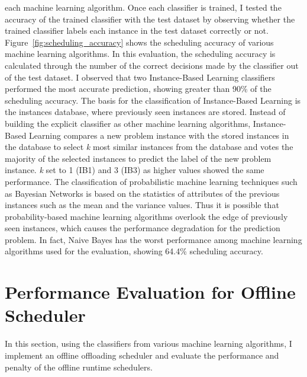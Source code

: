 each machine learning algorithm.
%
Once each classifier is trained, I tested the accuracy of the
trained classifier with the test dataset by observing whether the
trained classifier labels each instance in the test dataset correctly or
not.\\
%
Figure~\ref{fig:scheduling_accuracy} shows the scheduling accuracy of
various machine learning algorithms.
%
In this evaluation, the scheduling accuracy is calculated through the
number of the correct decisions made by the classifier out of the test
dataset.
%
I observed that two Instance-Based Learning classifiers performed 
the most accurate prediction, showing greater than 90\% of the scheduling
accuracy.
%
The basis for the classification of Instance-Based Learning is the instances 
database, where previously seen instances are stored.
%
Instead of building the explicit classifier as other machine learning
algorithms, Instance-Based Learning compares a new problem instance with the stored
instances in the database to select {\it k} most similar instances 
from the database and votes the majority of the selected instances to 
predict the label of the new problem instance.
%
{\it k} set to 1 (IB1) and 3 (IB3) as higher values showed the same
performance. 
%
The classification of probabilistic machine learning
techniques such as Bayesian Networks is based on the statistics
of attributes of the previous instances such as the mean and the
variance values.
%
Thus it is possible that probability-based machine learning
algorithms overlook the edge of previously seen instances, which causes
the performance degradation for the prediction problem. 
%
In fact, Naive Bayes has the worst performance among machine learning
algorithms used for the evaluation, showing 64.4\% scheduling
accuracy.
%

\section{Performance Evaluation for Offline Scheduler}
\label{scheduler:offline}
%
In this section, using the classifiers from various machine learning
algorithms, I implement an offline offloading scheduler and evaluate
the performance and penalty of the offline runtime schedulers.
%


